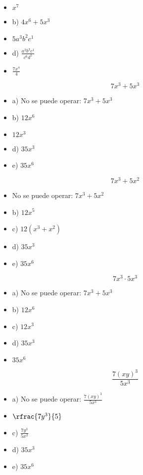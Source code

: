 
\begin{itemize}
\item {} $x^7$
\item b) $4x^6+5x^3$
\item {} $5a^3b^2c^1$
\item d) $\frac{a^2b^3c^1}{c^6d^5}$
\item {} $\frac{7x^4}{4}$
\end{itemize}


\[
	7x^3+5x^3
\]

\begin{itemize}
	\item a) No se puede operar: $7x^3+5x^3$
	\item b) $12x^6$
	\item {} $12x^3$
	\item d) $35x^3$
	\item e) $35x^6$
\end{itemize}

\[
	7x^3+5x^2
\]

\begin{itemize}
	\item {}No se puede operar:  $7x^3+5x^2$
	\item b) $12x^5$
	\item c) $12(x^3+x^2)$
	\item d) $35x^3$
	\item e) $35x^6$
\end{itemize}

\[
	7x^3·5x^3
\]

\begin{itemize}
	\item a) No se puede operar: $7x^3+5x^3$
	\item b) $12x^6$
	\item c) $12x^3$
	\item d) $35x^3$
	\item {} $35x^6$
\end{itemize}


\[
	\frac{7(xy)^3}{5x^3}
\]

\begin{itemize}
	\item a) No se puede operar: $\frac{7(xy)^3}{5x^3}$
	\item {} $\rfrac{7y^3}{5}$
	\item c) $\frac{7y^3}{5x^2}$
	\item d) $35x^3$
	\item e) $35x^6$
\end{itemize}

